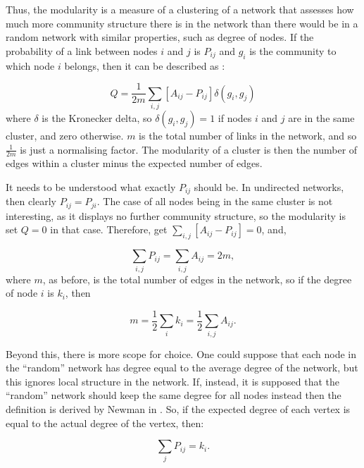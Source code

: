 Thus, the modularity is a measure of a clustering of a network that assesses 
how much more community structure there is in the network than there would be 
in a random network with similar properties, such as degree of nodes.  If the 
probability of a link between nodes $i$ and $j$ is $P_{ij}$ and $g_i$ is the 
community to which node $i$ belongs, then it can be described as 
\cite{Newman2006b}:

\begin{equation}
Q = \frac{1}{2m}\sum_{i,j}[A_{ij} - P_{ij}]\delta(g_i,g_j)
\end{equation}
where $\delta$ is the Kronecker delta, so $\delta(g_i,g_j)=1$ if nodes 
$i$ and $j$ are in the same cluster, and zero otherwise. $m$ is the total 
number of links in the network, and so $\frac{1}{2m}$ is just a normalising 
factor.  The modularity of a cluster is then the number of edges within a 
cluster minus the expected number of edges.

It needs to be understood what exactly $P_{ij}$ should be.  In undirected networks, 
then clearly $P_{ij} = P_{ji}$.  The case of all nodes being in the same 
cluster is not interesting, as it displays no further community structure, so the modularity is set 
$Q=0$ in that case.  Therefore, get $\sum_{i,j}[A_{ij} - P_{ij}] = 0$, and,

\begin{equation}
\sum_{i,j}P_{ij} = \sum_{i,j} A_{ij} = 2m,
\end{equation}
where $m$, as before, is the total number of edges in the network, so if the 
degree of node $i$ is $k_i$, then

\begin{equation}
m = \frac{1}{2}\sum_i k_i = \frac{1}{2}\sum_{i,j} A_{ij}.
\end{equation}

Beyond this, there is more scope for choice.  One could suppose that each node 
in the ``random'' network has degree equal to the average degree of the 
network, but this ignores local structure in the network.  If, instead, it is supposed that 
the ``random'' network should keep the same degree for all nodes instead then the definition is derived by Newman in \cite{Newman2006a}.  So, if the expected 
degree of each vertex is equal to the actual degree of the vertex, then:

\begin{equation}
\sum_j P_{ij} = k_i.
\label{probki}
\end{equation}

